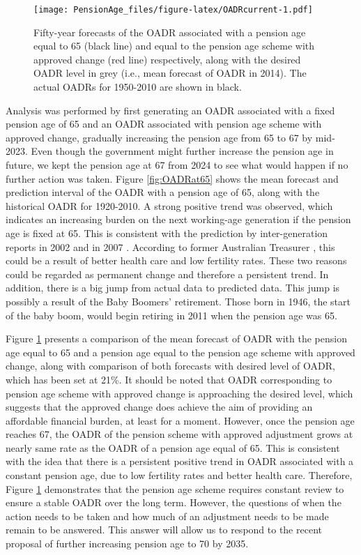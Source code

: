 \documentclass[11pt,a4paper,]{article}
\begin{document}
\begin{figure}
\centering
\texttt{[image: PensionAge\_files/figure-latex/OADRcurrent-1.pdf]}
\caption{\label{fig:OADRcurrent}Fifty-year forecasts of the OADR associated
with a pension age equal to 65 (black line) and equal to the pension age
scheme with approved change (red line) respectively, along with the
desired OADR level in grey (i.e., mean forecast of OADR in 2014). The
actual OADRs for 1950-2010 are shown in black.}
\end{figure}

Analysis was performed by first generating an OADR associated with a
fixed pension age of 65 and an OADR associated with pension age scheme
with approved change, gradually increasing the pension age from 65 to 67
by mid-2023. Even though the government might further increase the
pension age in future, we kept the pension age at 67 from 2024 to see
what would happen if no further action was taken. Figure
\ref{fig:OADRat65} shows the mean forecast and prediction interval of
the OADR with a pension age of 65, along with the historical OADR for
1920-2010. A strong positive trend was observed, which indicates an
increasing burden on the next working-age generation if the pension age
is fixed at 65. This is consistent with the prediction by
inter-generation reports in 2002 \autocite{IGR02} and in 2007
\autocite{IGR07}. According to former Australian Treasurer
\textcite{Costello04}, this could be a result of better health care and
low fertility rates. These two reasons could be regarded as permanent
change and therefore a persistent trend. In addition, there is a big
jump from actual data to predicted data. This jump is possibly a result
of the Baby Boomers' retirement. Those born in 1946, the start of the
baby boom, would begin retiring in 2011 when the pension age was 65.

Figure \ref{fig:OADRcurrent} presents a comparison of the mean forecast
of OADR with the pension age equal to 65 and a pension age equal to the
pension age scheme with approved change, along with comparison of both
forecasts with desired level of OADR, which has been set at 21\%. It
should be noted that OADR corresponding to pension age scheme with
approved change is approaching the desired level, which suggests that
the approved change does achieve the aim of providing an affordable
financial burden, at least for a moment. However, once the pension age
reaches 67, the OADR of the pension scheme with approved adjustment
grows at nearly same rate as the OADR of a pension age equal of 65. This
is consistent with the idea that there is a persistent positive trend in
OADR associated with a constant pension age, due to low fertility rates
and better health care. Therefore, Figure \ref{fig:OADRcurrent}
demonstrates that the pension age scheme requires constant review to
ensure a stable OADR over the long term. However, the questions of when
the action needs to be taken and how much of an adjustment needs to be
made remain to be answered. This answer will allow us to respond to the
recent proposal of further increasing pension age to 70 by 2035.
\end{document}
